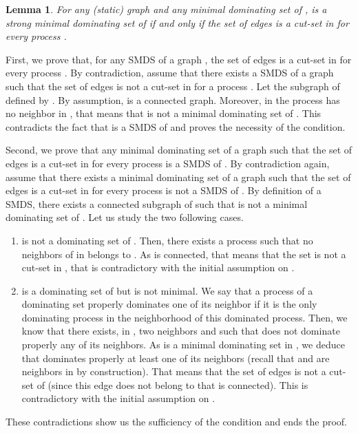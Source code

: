 \documentclass{article}
\newtheorem{lemma}{Lemma}
\newenvironment{proof}{{\bf Proof. } }{{\hfill }}
\begin{document}
\begin{lemma}\label{lem:characterization}
For any (static) graph  and any minimal dominating set  of ,  is a strong minimal dominating set of  if and only if the set of edges  is a cut-set in  for every process .
\end{lemma}

\begin{proof}
First, we prove that, for any SMDS  of a graph , the set of edges  is a cut-set in  for every process . By contradiction, assume that there exists a SMDS  of a graph  such that the set of edges  is not a cut-set in  for a process . Let  the subgraph of  defined by . By assumption,  is a connected graph. Moreover, in  the process  has no neighbor in , that means that  is not a minimal dominating set of . This contradicts the fact that  is a SMDS of  and proves the necessity of the condition.

Second, we prove that any minimal dominating set  of a graph  such that the set of edges  is a cut-set in  for every process  is a SMDS of . By contradiction again, assume that there exists a minimal dominating set  of a graph  such that the set of edges  is a cut-set in  for every process  is not a SMDS of . By definition of a SMDS, there exists a connected subgraph  of  such that  is not a minimal dominating set of . Let us study the two following cases.

\begin{enumerate}
\item  is not a dominating set of . Then, there exists a process  such that no neighbors of  in  belongs to . As  is connected, that means that the set  is not a cut-set in , that is contradictory with the initial assumption on .
\item  is a dominating set of  but is not minimal. We say that a process of a dominating set properly dominates one of its neighbor if it is the only dominating process in the neighborhood of this dominated process. Then, we know that there exists, in , two neighbors  and  such that  does not dominate properly any of its neighbors. As  is a minimal dominating set in , we deduce that  dominates properly at least one of its neighbors  (recall that  and  are neighbors in  by construction). That means that the set of edges  is not a cut-set of  (since this edge does not belong to  that is connected). This is contradictory with the initial assumption on .
\end{enumerate}

These contradictions show us the sufficiency of the condition and ends the proof.
\end{proof}
\end{document}

